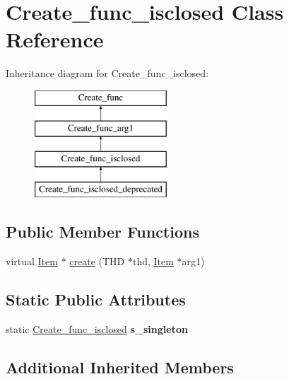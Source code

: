 \hypertarget{classCreate__func__isclosed}{}\section{Create\+\_\+func\+\_\+isclosed Class Reference}
\label{classCreate__func__isclosed}
Inheritance diagram for Create\+\_\+func\+\_\+isclosed\+:\begin{figure}[H]
\begin{center}
\leavevmode
\includegraphics[height=4.000000cm]{classCreate__func__isclosed}
\end{center}
\end{figure}
\subsection*{Public Member Functions}
\begin{DoxyCompactItemize}
\item 
virtual \mbox{\hyperlink{classItem}{Item}} $\ast$ \mbox{\hyperlink{classCreate__func__isclosed_a1df58b5c9845fbf47e2fe5bb6978b428}{create}} (T\+HD $\ast$thd, \mbox{\hyperlink{classItem}{Item}} $\ast$arg1)
\end{DoxyCompactItemize}
\subsection*{Static Public Attributes}
\begin{DoxyCompactItemize}
\item 
\mbox{\label{classCreate__func__isclosed_ae06da8d475da17a3a964c4d768a92438}} 
static \mbox{\hyperlink{classCreate__func__isclosed}{Create\+\_\+func\+\_\+isclosed}} {\bfseries s\+\_\+singleton}
\end{DoxyCompactItemize}
\subsection*{Additional Inherited Members}


